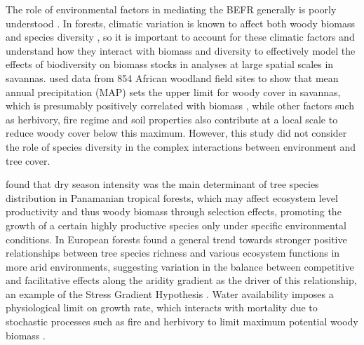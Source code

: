 \documentclass[11pt,a4paper]{article}
\begin{document}
The role of environmental factors in mediating the BEFR generally is poorly understood \citep{Ratcliffe2017}. In forests, climatic variation is known to affect both woody biomass \citep{Michaletz2014, Michaletz2018} and species diversity \citep{}, so it is important to account for these climatic factors and understand how they interact with biomass and diversity to effectively model the effects of biodiversity on biomass stocks in analyses at large spatial scales in savannas. \citet{Sankaran2005} used data from 854 African woodland field sites to show that mean annual precipitation (MAP) sets the upper limit for woody cover in savannas, which is presumably positively correlated with biomass \citep{}, while other factors such as herbivory, fire regime and soil properties also contribute at a local scale to reduce woody cover below this maximum. However, this study did not consider the role of species diversity in the complex interactions between environment and tree cover. 

\citet{Condit2013} found that dry season intensity was the main determinant of tree species distribution in Panamanian tropical forests, which may affect ecosystem level productivity and thus woody biomass through selection effects, promoting the growth of a certain highly productive species only under specific environmental conditions. In European forests \citep{Ratcliffe2017} found a general trend towards stronger positive relationships between tree species richness and various ecosystem functions in more arid environments, suggesting variation in the balance between competitive and facilitative effects along the aridity gradient as the driver of this relationship, an example of the Stress Gradient Hypothesis \citep{Dohn2013}. Water availability imposes a physiological limit on growth rate, which interacts with mortality due to stochastic processes such as fire and herbivory to limit maximum potential woody biomass \citep{}. 
\end{document}
